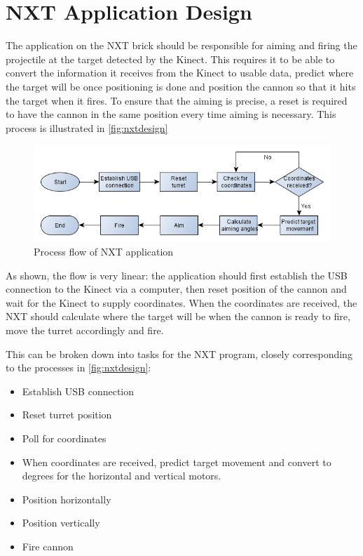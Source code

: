 \section{NXT Application Design}

\label{nxtdesign}

The application on the NXT brick should be responsible for aiming and firing the projectile at the target detected by the Kinect. This requires it to be able to convert the information it receives from the Kinect to usable data, predict where the target will be once positioning is done and position the cannon so that it hits the target when it fires. To ensure that the aiming is precise, a reset is required to have the cannon in the same position every time aiming is necessary. This process is illustrated in \autoref{fig:nxtdesign}

\begin{figure}[hbtp]
	\includegraphics[scale=0.5]{img/nxtdesign.png}
	\caption{Process flow of NXT application}
	\label{fig:nxtdesign}
\end{figure}

As shown, the flow is very linear: the application should first establish the USB connection to the Kinect via a computer, then reset position of the cannon and wait for the Kinect to supply coordinates. When the coordinates are received, the NXT should calculate where the target will be when the cannon is ready to fire, move the turret accordingly and fire.

This can be broken down into tasks for the NXT program, closely corresponding to the processes in \autoref{fig:nxtdesign}:
\begin{itemize}
	\item Establish USB connection
	\item Reset turret position
	\item Poll for coordinates
	\item When coordinates are received, predict target movement and convert to degrees for the horizontal and vertical motors.
	\item Position horizontally
	\item Position vertically
	\item Fire cannon
\end{itemize}

